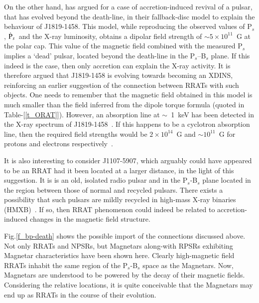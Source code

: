 \documentclass{jaa}
\newcommand{\psdot}{\mbox{$\dot{\rm P}_s$}}
\begin{document}
On  the  other  hand,     has  argued  for  a  case  of
accretion-induced revival  of a  pulsar, that  has evolved  beyond the
death-line, in their  fallback-disc model to explain  the behaviour of
J1819-1458.   This model,  while  reproducing the  observed values  of
P$_s$,  \psdot~and  the  X-ray  luminosity, obtains  a  dipolar  field
strength of $\sim 5 \times 10^{11}$~G at the polar cap.  This value of
the magnetic field  combined with the measured P$_s$  implies a `dead'
pulsar, located beyond  the death-line in the  P$_s$--B$_s$ plane.  If
this indeed  is the case,  then only  accretion can explain  the X-ray
activity.  It is therefore argued  that J1819-1458 is evolving towards
becoming an XDINS, reinforcing an earlier suggestion of the connection
between  RRATs with  such objects.   One  needs to  remember that  the
magnetic field obtained  in this model is much smaller  than the field
inferred    from    the    dipole   torque    formula    (quoted    in
Table-[\ref{t_ORAT}]).  However, an absorption line at $\sim$~1~keV has
been detected  in the  X-ray spectrum of  J1819-1458~\cite{rea09}.  If
this  happens to  be a  cyclotron absorption  line, then  the required
field strengths would be $2 \times 10^{14}$~G and $\sim 10^{11}$~G for
protons and electrons respectively~\cite{mille13}.

It is  also interesting to  consider J1107-5907, which  arguably could
have appeared to be an RRAT had  it been located at a larger distance,
in the  light of  this suggestion.   It is is  an old,  isolated radio
pulsar  and in  the P$_s$-B$_s$  plane located  in the  region between
those of normal and recycled  pulsars. There exists a possibility that
such  pulsars   are  mildly  recycled  in   high-mass  X-ray  binaries
(HMXB)~\cite{konar99a,konar17e}.  If so,  then  RRAT phenomenon  could
indeed be related  to accretion-induced changes in  the magnetic field
structure.

Fig.\ref{f_bp-death}  shows the  possible  import  of the  connections
discussed above.   Not only RRATs  and NPSRs, but  Magnetars along-with
RPSRs   exhibiting   Magnetar    characteristics   have   been   shown
here. Clearly high-magnetic field RRATs inhabit the same region of
the P$_s$-B$_s$ space as the Magnetars.  Now, Magnetars are understood
to be powered  by the decay of their magnetic  fields. Considering the
relative locations, it is quite conceivable that the Magnetars may end
up as  RRATs in the course  of their evolution.
\end{document}
